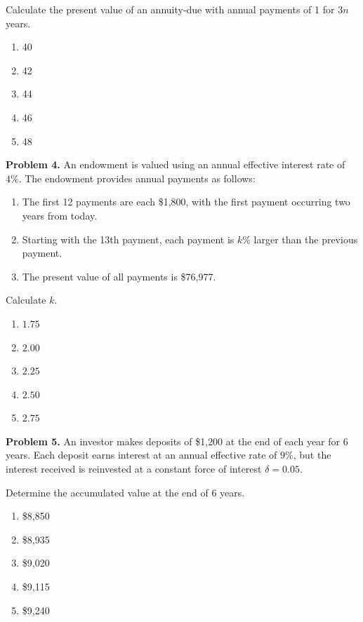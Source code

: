 \documentclass[12pt]{article}
\begin{document}
Calculate the present value of an annuity-due with annual payments of 1 for $3n$ years.

\vspace{.5cm}

\begin{enumerate}[label = \Alph*.]
\item 40
\item 42
\item 44
\item 46
\item 48
\end{enumerate}

\newpage


\noindent \textbf{Problem 4.}
An endowment is valued using an annual effective interest rate of $4\%$. The endowment provides annual payments as follows:

\begin{enumerate}[label = \roman*.]
\item The first 12 payments are each \$1{,}800, with the first payment occurring two years from today.
\item Starting with the 13th payment, each payment is $k\%$ larger than the previous payment.
\item The present value of all payments is \$76{,}977.
\end{enumerate}

Calculate $k$.

\vspace{.5cm}

\begin{enumerate}[label = \Alph*.]
\item $1.75$
\item $2.00$
\item $2.25$
\item $2.50$
\item $2.75$
\end{enumerate}

\newpage

\noindent \textbf{Problem 5.}
An investor makes deposits of \$1{,}200 at the end of each year for 6 years. Each deposit earns interest at an annual effective rate of $9\%$, but the interest received is reinvested at a constant force of interest $\delta = 0.05$.

Determine the accumulated value at the end of 6 years.

\vspace{.5cm}

\begin{enumerate}[label = \Alph*.]
\item \$8{,}850
\item \$8{,}935
\item \$9{,}020
\item \$9{,}115
\item \$9{,}240
\end{enumerate}
\end{document}
